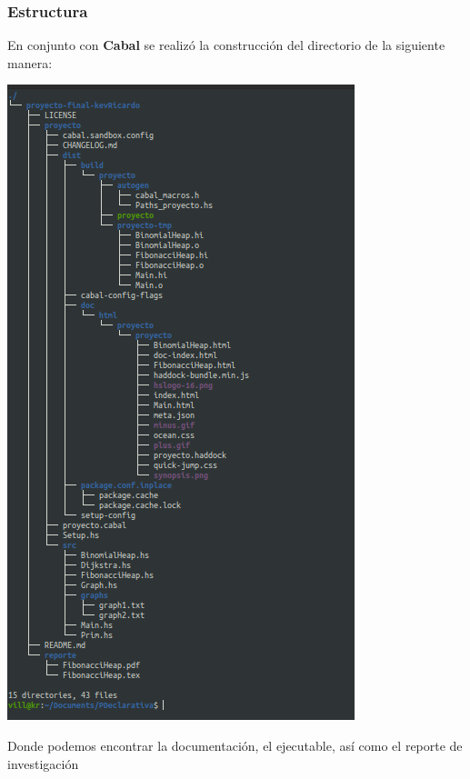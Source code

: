 \documentclass[a4paper, titlepage, 12pt]{article}
\theoremstyle{definition}%
\theoremstyle{Teorema}
\theoremstyle{break}
\begin{document}
\subsubsection{Estructura}
En conjunto con \textbf{Cabal} se realizó la construcción del directorio de la siguiente manera:
\begin{center}
  \includegraphics[scale=.5]{img/treepath.png}
\end{center}
Donde podemos encontrar la documentación, el ejecutable, así como el reporte de investigación
\end{document}

